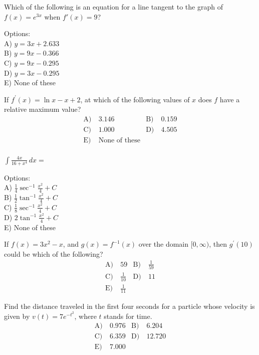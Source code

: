 \begin{problem}\label{AI-Calculus3}
Which of the following is an equation for a line tangent to the graph of \( f(x) = e^{3x} \) when \( f'(x) = 9 \)?

\noindent Options:\\
A) \( y = 3x + 2.633 \)\\
B) \( y = 9x - 0.366 \)\\
C) \( y = 9x - 0.295 \)\\
D) \( y = 3x - 0.295 \)\\
E) None of these
\end{problem}


\begin{problem}\label{PreCal-3}
If $f^{\prime}(x)=\ln x-x+2$, at which of the following values of $x$ does $f$ have a relative maximum value?
\begin{align*}
\text{A)}\ & 3.146 &
\text{B)}\ & 0.159 \\
\text{C)}\ & 1.000&
\text{D)}\ & 4.505 \\
\text{E)}\ & \text{None of these}\\
\end{align*}    
\end{problem}


\begin{problem}\label{AI-Calculus4}
\( \int \frac{4x}{16+x^4} \,dx = \)

\noindent Options:\\
A) \( \frac{1}{4} \sec^{-1} \frac{x^2}{4} + C \)\\
B) \( \frac{1}{2} \tan^{-1} \frac{x^2}{4} + C \)\\
C) \( \frac{1}{8} \sec^{-1} \frac{x^2}{4} + C \)\\
D) \( 2 \tan^{-1} \frac{x^2}{4} + C \)\\
E) None of these
\end{problem}


\begin{problem}\label{PreCal-5}
If $f(x)=3 x^{2}-x$, and $g(x)=f^{-1}(x)$ over the domain $[0, \infty)$, then $g^{\prime}(10)$ could be which of the following?
\begin{align*}
\text{A)}\ & 59 &
\text{B)}\ & \frac{1}{59} \\
\text{C)}\ & \frac{1}{10}  &
\text{D)}\ & 11\\
\text{E)}\ & \frac{1}{11}&
\end{align*}    
\end{problem}


\begin{problem}\label{PreCal-6}
Find the distance traveled in the first four seconds for a particle whose velocity is given by $v(t)=7 e^{-t^{2}}$, where $t$ stands for time.
\begin{align*}
\text{A)}\ &  0.976 &
\text{B)}\ & 6.204 \\
\text{C)}\ &  6.359 &
\text{D)}\ & 12.720\\
\text{E)}\ & 7.000 &
\end{align*}    
\end{problem}


